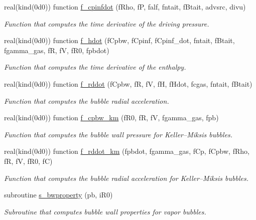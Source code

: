 \begin{DoxyCompactItemize}
real(kind(0d0)) function \hyperlink{namespacem__bubbles_aa55a0894ed331f2e462b83b8df1d265b}{f\+\_\+cpinfdot} (f\+Rho, fP, falf, fntait, f\+Btait, advsrc, divu)
\begin{DoxyCompactList}\small\item\em Function that computes the time derivative of the driving pressure. \end{DoxyCompactList}\item 
real(kind(0d0)) function \hyperlink{namespacem__bubbles_aa7656a8db7cafecfff27383756eacce7}{f\+\_\+hdot} (f\+Cpbw, f\+Cpinf, f\+Cpinf\+\_\+dot, fntait, f\+Btait, fgamma\+\_\+gas, fR, fV, f\+R0, fpbdot)
\begin{DoxyCompactList}\small\item\em Function that computes the time derivative of the enthalpy. \end{DoxyCompactList}\item 
real(kind(0d0)) function \hyperlink{namespacem__bubbles_a1795309127be53d799a3374ba984498c}{f\+\_\+rddot} (f\+Cpbw, fR, fV, fH, f\+Hdot, fcgas, fntait, f\+Btait)
\begin{DoxyCompactList}\small\item\em Function that computes the bubble radial acceleration. \end{DoxyCompactList}\item 
real(kind(0d0)) function \hyperlink{namespacem__bubbles_a3af121d17dd214c10e2ea5881e124e28}{f\+\_\+cpbw\+\_\+km} (f\+R0, fR, fV, fgamma\+\_\+gas, fpb)
\begin{DoxyCompactList}\small\item\em Function that computes the bubble wall pressure for Keller--Miksis bubbles. \end{DoxyCompactList}\item 
real(kind(0d0)) function \hyperlink{namespacem__bubbles_a0d72f8fddc9e7423b723b71bd792463e}{f\+\_\+rddot\+\_\+km} (fpbdot, fgamma\+\_\+gas, f\+Cp, f\+Cpbw, f\+Rho, fR, fV, f\+R0, fC)
\begin{DoxyCompactList}\small\item\em Function that computes the bubble radial acceleration for Keller--Miksis bubbles. \end{DoxyCompactList}\item 
subroutine \hyperlink{namespacem__bubbles_a784afc585b20a8450d23867931c0b5fc}{s\+\_\+bwproperty} (pb, i\+R0)
\begin{DoxyCompactList}\small\item\em Subroutine that computes bubble wall properties for vapor bubbles. \end{DoxyCompactList}\item 

\end{DoxyCompactItemize}
